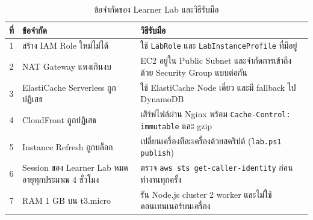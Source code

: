 \begin{table}[H]
\centering
\caption{ข้อจำกัดของ Learner Lab และวิธีรับมือ}
\label{tab:learner_lab_solutions}
\small
\begin{tabularx}{\textwidth}{cX>{\raggedright\arraybackslash}X}
\toprule
\textbf{ที่} & \textbf{ข้อจำกัด} & \textbf{วิธีรับมือ} \\
\midrule
1 & สร้าง IAM Role ใหม่ไม่ได้ & ใช้ \texttt{LabRole} และ \texttt{LabInstanceProfile} ที่มีอยู่ \\
2 & NAT Gateway แพงเกินงบ & EC2 อยู่ใน Public Subnet และจำกัดการเข้าถึงด้วย Security Group แบบต่อกัน \\
3 & ElastiCache Serverless ถูกปฏิเสธ & ใช้ ElastiCache Node เดี่ยว และมี fallback ไป DynamoDB \\
4 & CloudFront ถูกปฏิเสธ & เสิร์ฟไฟล์ผ่าน Nginx พร้อม \texttt{Cache-Control: immutable} และ gzip \\
5 & Instance Refresh ถูกบล็อก & เปลี่ยนเครื่องทีละเครื่องด้วยสคริปต์ (\texttt{lab.ps1 publish}) \\
6 & Session ของ Learner Lab หมดอายุทุกประมาณ 4 ชั่วโมง & ตรวจ \texttt{aws sts get-caller-identity} ก่อนทำงานทุกครั้ง \\
7 & RAM 1 GB บน t3.micro & รัน Node.js cluster 2 worker และไม่ใช้คอนเทนเนอร์บนเครื่อง \\
\bottomrule
\end{tabularx}
\end{table}
